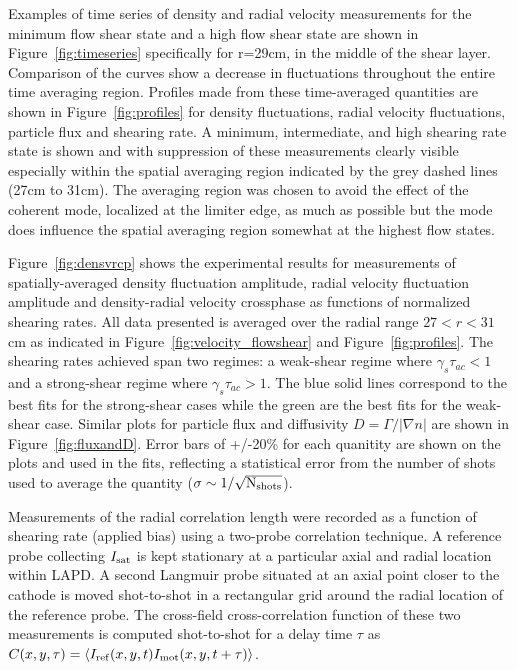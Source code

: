 \documentclass[aip,pop,amsmath,amssymb,peprint,superscriptaddress]{revtex4-1} %
\begin{document}
Examples of time series of density and radial velocity measurements for the minimum flow shear state and a high flow shear state are shown in Figure~\ref{fig:timeseries} specifically for r=29cm, in the middle of the shear layer. Comparison of the curves show a decrease in fluctuations throughout the entire time averaging region. Profiles made from these time-averaged quantities are shown in Figure~\ref{fig:profiles} for density fluctuations, radial velocity fluctuations, particle flux and shearing rate. A minimum, intermediate, and high shearing rate state is shown and with suppression of these measurements clearly visible especially within the spatial averaging region indicated by the grey dashed lines (27cm to 31cm). The averaging region was chosen to avoid the effect of the coherent mode, localized at the limiter edge, as much as possible but the mode does influence the spatial averaging region somewhat at the highest flow states.

Figure~\ref{fig:densvrcp} shows the experimental
results for measurements of spatially-averaged density fluctuation amplitude, radial
velocity fluctuation amplitude and density-radial velocity crossphase as functions
of normalized shearing rates. All data presented is averaged over the radial range $27 < r < 31$cm as indicated in Figure~\ref{fig:velocity_flowshear} and Figure~\ref{fig:profiles}. The shearing rates achieved span two
regimes: a weak-shear regime where $\gamma_{s}\tau_{ac} < 1$ and a
strong-shear regime where $\gamma_{s}\tau_{ac} > 1$. The blue solid
lines correspond to the best fits for the strong-shear cases while the
green are the best fits for the weak-shear case.  Similar plots for
particle flux and diffusivity $D = \Gamma/|\nabla n|$ are shown in
Figure~\ref{fig:fluxandD}. Error bars of +/-20\% for each quanitity are
shown on the plots and used in the fits, reflecting a statistical
error from the number of shots used to average the quantity ($\sigma
\sim 1/\sqrt{\rm N_{shots}}$). 

Measurements of the radial correlation length were recorded as a function of shearing rate (applied bias) using a two-probe correlation technique. A reference probe collecting $I_{\rm sat}$ is kept stationary at a particular axial and radial location within LAPD. A second Langmuir probe situated at an axial point closer to the cathode is moved shot-to-shot in a rectangular grid around the radial location of the reference probe.  The cross-field cross-correlation function of these two measurements is computed shot-to-shot for a delay time $\tau$ as $C(x,y,\tau) = \langle I_{\rm ref}(x,y,t)I_{\rm mot}(x,y,t+\tau)\rangle$.
\end{document}
